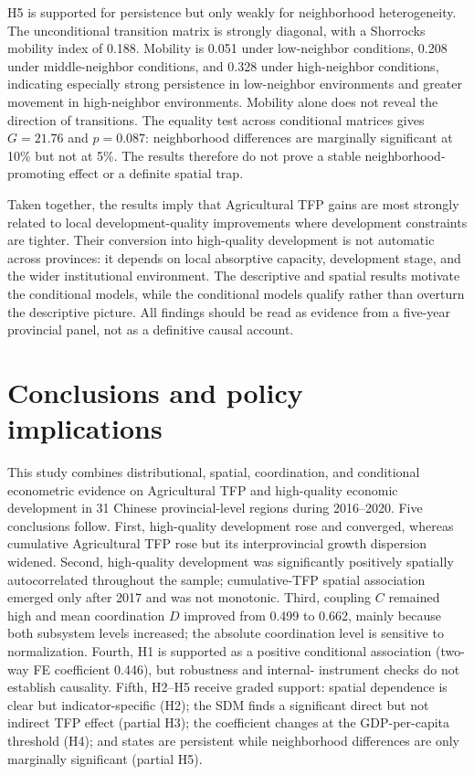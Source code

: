 \documentclass[sustainability,article,submit,moreauthors]{Definitions/mdpi}
\numberwithin{equation}{section}
\begin{document}
H5 is supported for persistence but only weakly for neighborhood heterogeneity.
The unconditional transition matrix is strongly diagonal, with a Shorrocks
mobility index of 0.188. Mobility is 0.051 under low-neighbor conditions, 0.208
under middle-neighbor conditions, and 0.328 under high-neighbor conditions,
indicating especially strong persistence in low-neighbor environments and
greater movement in high-neighbor environments. Mobility alone does not reveal
the direction of transitions. The equality test across conditional matrices
gives $G=21.76$ and $p=0.087$: neighborhood differences are marginally
significant at 10\% but not at 5\%. The results therefore do not prove a stable
neighborhood-promoting effect or a definite spatial trap.

Taken together, the results imply that Agricultural TFP gains are most strongly
related to local development-quality improvements where development constraints
are tighter. Their conversion into high-quality development is not automatic
across provinces: it depends on local absorptive capacity, development stage,
and the wider institutional environment. The descriptive and spatial results
motivate the conditional models, while the conditional models qualify rather
than overturn the descriptive picture. All findings should be read as evidence
from a five-year provincial panel, not as a definitive causal account.

\section{Conclusions and policy implications}

This study combines distributional, spatial, coordination, and conditional
econometric evidence on Agricultural TFP and high-quality economic development
in 31 Chinese provincial-level regions during 2016--2020. Five conclusions
follow. First, high-quality development rose and converged, whereas cumulative
Agricultural TFP rose but its interprovincial growth dispersion widened.
Second, high-quality development was significantly positively spatially
autocorrelated throughout the sample; cumulative-TFP spatial association
emerged only after 2017 and was not monotonic. Third, coupling $C$ remained
high and mean coordination $D$ improved from 0.499 to 0.662, mainly because
both subsystem levels increased; the absolute coordination level is sensitive
to normalization. Fourth, H1 is supported as a positive conditional
association (two-way FE coefficient 0.446), but robustness and internal-
instrument checks do not establish causality. Fifth, H2--H5 receive graded
support: spatial dependence is clear but indicator-specific (H2); the SDM finds
a significant direct but not indirect TFP effect (partial H3); the coefficient
changes at the GDP-per-capita threshold (H4); and states are persistent while
neighborhood differences are only marginally significant (partial H5).
\end{document}
